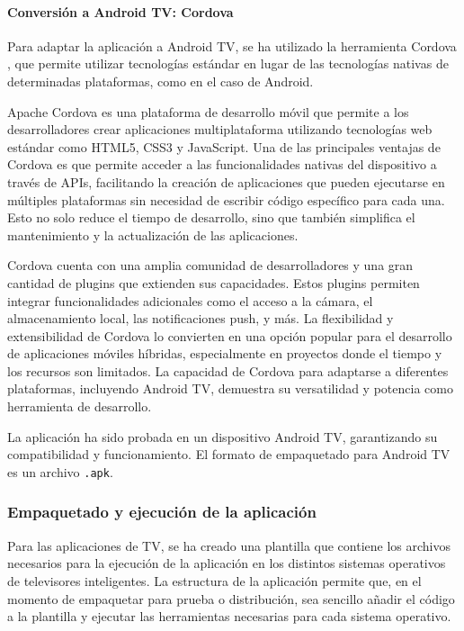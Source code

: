 \paragraph{Conversión a Android TV: Cordova}
\label{par:adaptabilidad_android_tv_conversion}

Para adaptar la aplicación a Android TV, se ha utilizado la herramienta Cordova \cite{Cordova}, que permite utilizar 
tecnologías estándar en lugar de las tecnologías nativas de determinadas plataformas, como en el caso de Android.

Apache Cordova es una plataforma de desarrollo móvil que permite a los desarrolladores crear aplicaciones 
multiplataforma utilizando tecnologías web estándar como HTML5, CSS3 y JavaScript. Una de las principales ventajas 
de Cordova es que permite acceder a las funcionalidades nativas del dispositivo a través de APIs, facilitando la 
creación de aplicaciones que pueden ejecutarse en múltiples plataformas sin necesidad de escribir código específico 
para cada una. Esto no solo reduce el tiempo de desarrollo, sino que también simplifica el mantenimiento y la 
actualización de las aplicaciones.

Cordova cuenta con una amplia comunidad de desarrolladores y una gran cantidad de plugins que extienden sus capacidades. 
Estos plugins permiten integrar funcionalidades adicionales como el acceso a la cámara, el almacenamiento local, 
las notificaciones push, y más. La flexibilidad y extensibilidad de Cordova lo convierten en una opción popular 
para el desarrollo de aplicaciones móviles híbridas, especialmente en proyectos donde el tiempo y los recursos son 
limitados. La capacidad de Cordova para adaptarse a diferentes plataformas, incluyendo Android TV, demuestra su 
versatilidad y potencia como herramienta de desarrollo.

La aplicación ha sido probada en un dispositivo Android TV, garantizando su compatibilidad y funcionamiento. El 
formato de empaquetado para Android TV es un archivo \texttt{.apk}.

\subsubsection{Empaquetado y ejecución de la aplicación}
\label{subsubsec:adaptabilidad_empaquetado_ejecucion}

Para las aplicaciones de TV, se ha creado una plantilla que contiene los archivos necesarios para la ejecución 
de la aplicación en los distintos sistemas operativos de televisores inteligentes. La estructura de la aplicación 
permite que, en el momento de empaquetar para prueba o distribución, sea sencillo añadir el código a la plantilla 
y ejecutar las herramientas necesarias para cada sistema operativo.
